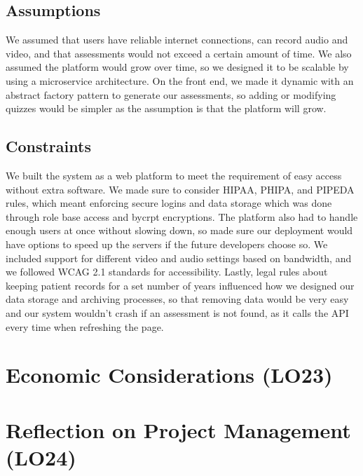 \documentclass{article}
\begin{document}
\subsection{Assumptions}
We assumed that users have reliable internet connections, can record audio and video, and that assessments would 
not exceed a certain amount of time. We also assumed the platform would grow over time, so we designed it to be 
scalable by using a microservice architecture. On the front end, we made it dynamic with an abstract 
factory pattern to generate our assessments, so adding or modifying quizzes would be simpler as the assumption is that the platform will grow. 

\subsection{Constraints}
We built the system as a web platform to meet the requirement of easy access without extra software. We made sure 
to consider HIPAA, PHIPA, and PIPEDA rules, which meant enforcing secure logins and data storage which was done through role base access and bycrpt encryptions. 
The platform also had to handle enough users at once without slowing down, so made sure our deployment would have options to speed up the servers if the 
future developers choose so. We included support for different video and audio settings based on bandwidth, and we followed 
WCAG 2.1 standards for accessibility. Lastly, legal rules about keeping patient records for a set number of years 
influenced how we designed our data storage and archiving processes, so that removing data would be very easy and our system wouldn't crash if an assessment is not found, as it calls the API every time when refreshing the page. 
\section{Economic Considerations (LO23)}


\section{Reflection on Project Management (LO24)}
\end{document}
